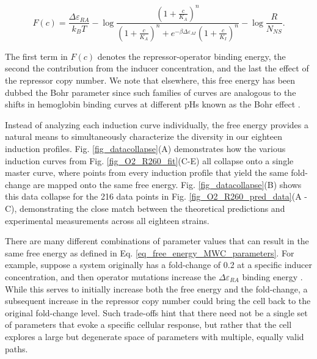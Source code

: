 \begin{equation}
	\label{eq_free_energy_MWC_parameters}
F(c) = \frac{\Delta\varepsilon_{RA}}{k_BT} - \log \frac{\left(1+\frac{c}{K_A}\right)^n}{\left(1+\frac{c}{K_A}\right)^n+e^{-\beta \Delta\varepsilon_{AI} }\left(1+\frac{c}{K_I}\right)^n} - \log \frac{R}{N_{NS}}.
\end{equation}

The first term in $F(c)$ denotes the repressor-operator binding energy, the second the contribution from the inducer
concentration, and the last
the effect of the repressor copy number. We note that elsewhere, this free energy
has been dubbed the Bohr parameter since such families of curves are analogous
to the shifts in hemoglobin binding curves at different pHs known as the Bohr
effect \cite{Mirny2010, Phillips2015a, Einav2016}.

Instead of analyzing each induction curve individually, the free energy provides
a natural means to simultaneously characterize the diversity in our eighteen
induction profiles. Fig. \ref{fig_datacollapse}(A) demonstrates how the
various induction curves from Fig. \ref{fig_O2_R260_fit}(C-E) all
collapse onto a single master curve, where points from every induction profile
that yield the same fold-change are mapped onto the same free energy.
Fig. \ref{fig_datacollapse}(B) shows this data collapse for the 216 data
points in Fig. \ref{fig_O2_R260_pred_data}(A - C), demonstrating the
close match between the theoretical predictions and experimental measurements
across all eighteen strains.

There are many different combinations of parameter values that can result in the
same free energy as defined in Eq. \ref{eq_free_energy_MWC_parameters}. For
example, suppose a system originally has a fold-change of 0.2 at a specific
inducer concentration, and then operator mutations increase the
$\Delta\varepsilon_{RA}$ binding energy \cite{Garcia2012}. While this serves to
initially increase both the free energy and the fold-change, a subsequent
increase in the repressor copy number could bring the cell back to the original
fold-change level. Such trade-offs hint that there need not be a single set of
parameters that evoke a specific cellular response, but rather that the cell
explores a large but degenerate space of parameters with multiple, equally valid
paths.

